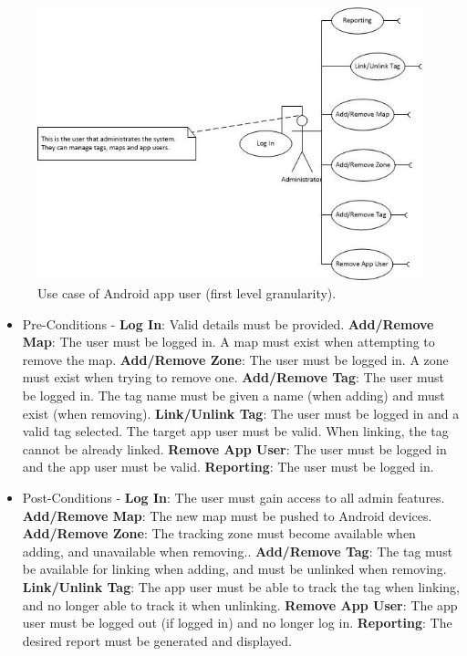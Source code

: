 \documentclass[11pt,titlepage]{article} %
\begin{document}
\begin{figure}[H]
\centering
\includegraphics[scale=1]{Admin.jpg}
\caption{Use case of Android app user (first level granularity).}
\end{figure}

\begin{itemize}
\item Pre-Conditions - \textbf{Log In}: Valid details must be provided. \textbf{Add/Remove Map}: The user must be logged in. A map must exist when attempting to remove the map. \textbf{Add/Remove Zone}: The user must be logged in. A zone must exist when trying to remove one. \textbf{Add/Remove Tag}: The user must be logged in. The tag name must be given a name (when adding) and must exist (when removing). \textbf{Link/Unlink Tag}: The user must be logged in and a valid tag selected. The target app user must be valid. When linking, the tag cannot be already linked. \textbf{Remove App User}: The user must be logged in and the app user must be valid. \textbf{Reporting}: The user must be logged in.
\item Post-Conditions - \textbf{Log In}: The user must gain access to all admin features. \textbf{Add/Remove Map}: The new map must be pushed to Android devices. \textbf{Add/Remove Zone}: The tracking zone must become available when adding, and unavailable when removing.. \textbf{Add/Remove Tag}: The tag must be available for linking when adding, and must be unlinked when removing. \textbf{Link/Unlink Tag}: The app user must be able to track the tag when linking, and no longer able to track it when unlinking. \textbf{Remove App User}: The app user must be logged out (if logged in) and no longer log in. \textbf{Reporting}: The desired report must be generated and displayed.
\end{itemize}
\end{document}
